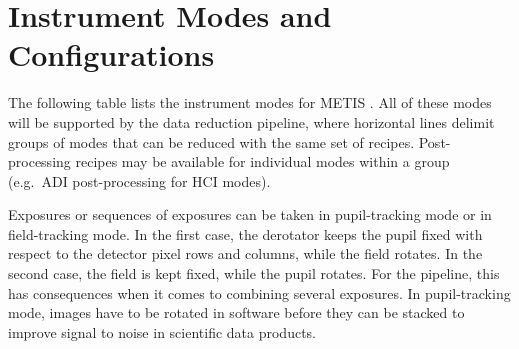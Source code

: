 \section{Instrument Modes and Configurations}
\label{sec:instrument_modes}

The following table lists the instrument modes for METIS
\cite{METIS-operational_concept}. All of these modes will be
supported by the data reduction pipeline, where horizontal lines
delimit groups of modes that can be reduced with the same set of
recipes.  Post-processing recipes may be available for individual
modes within a group (e.g.\ \ac{ADI} post-processing for HCI modes).

Exposures or sequences of exposures can be taken in pupil-tracking
mode or in field-tracking mode. In the first case, the derotator keeps
the pupil fixed with respect to the detector pixel rows and columns,
while the field rotates. In the second case, the field is kept fixed,
while the pupil rotates. For the pipeline, this has consequences when
it comes to combining several exposures. In pupil-tracking mode,
images have to be rotated in software before they can be stacked to
improve signal to noise in scientific data products.

